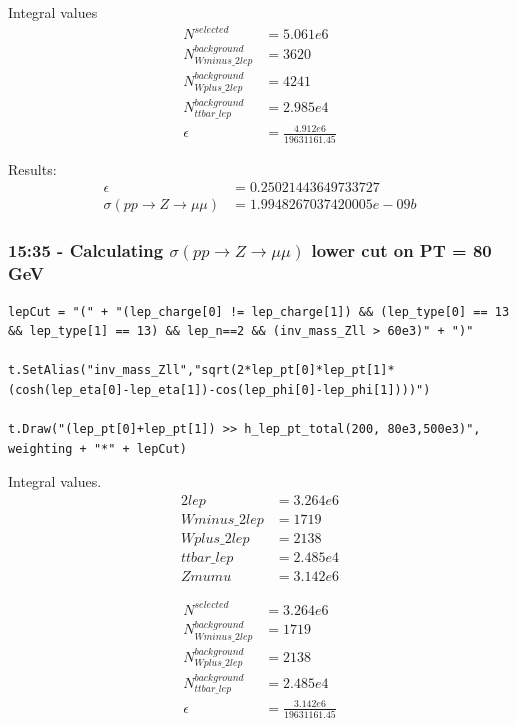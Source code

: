 Integral values
\begin{align}
    N^{selected} &= 5.061e6
    \\
    N^{background}_{Wminus\_2lep} &= 3620
    \\
    N^{background}_{Wplus\_2lep} &= 4241
    \\
    N^{background}_{ttbar\_lep} &= 2.985e4
    \\
    \epsilon &= \frac{4.912e6}{19631161.45}
\end{align}

Results:
\begin{align}
    \epsilon &= 0.25021443649733727
    \\
    \sigma (pp \rightarrow Z \rightarrow \mu\mu) &= 1.9948267037420005e-09 b
\end{align}


\subsubsection*{15:35 - Calculating $\sigma(pp \rightarrow Z \rightarrow \mu\mu)$ lower cut on PT = 80 GeV}

\begin{lstlisting}
lepCut = "(" + "(lep_charge[0] != lep_charge[1]) && (lep_type[0] == 13 && lep_type[1] == 13) && lep_n==2 && (inv_mass_Zll > 60e3)" + ")"

t.SetAlias("inv_mass_Zll","sqrt(2*lep_pt[0]*lep_pt[1]*(cosh(lep_eta[0]-lep_eta[1])-cos(lep_phi[0]-lep_phi[1])))")

t.Draw("(lep_pt[0]+lep_pt[1]) >> h_lep_pt_total(200, 80e3,500e3)", weighting + "*" + lepCut)
\end{lstlisting}

Integral values. 
\begin{align}
    2lep &= 3.264e6
    \\
    Wminus\_2lep &= 1719
    \\
    Wplus\_2lep &= 2138
    \\
    ttbar\_lep &= 2.485e4
    \\
    Zmumu &= 3.142e6
\end{align}


\begin{align}
    N^{selected} &= 3.264e6
    \\
    N^{background}_{Wminus\_2lep} &= 1719
    \\
    N^{background}_{Wplus\_2lep} &= 2138
    \\
    N^{background}_{ttbar\_lep} &= 2.485e4
    \\
    \epsilon &= \frac{3.142e6}{19631161.45}
\end{align}

